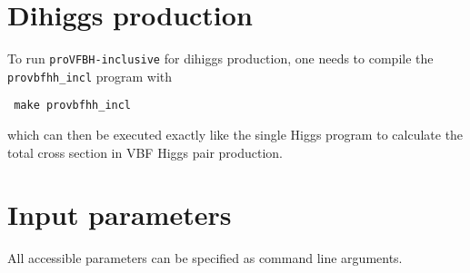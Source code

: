 \documentclass[12pt,a4]{article}
\newcommand{\provbfhincl}{\texttt{proVFBH-inclusive}\xspace}
\begin{document}
\section{Dihiggs production}
To run \provbfhincl for dihiggs production, one needs to compile the
\texttt{provbfhh\_incl} program with
\begin{verbatim}
 make provbfhh_incl
\end{verbatim}
which can then be executed exactly like the single Higgs program to
calculate the total cross section in VBF Higgs pair production.
\section{Input parameters}
All accessible parameters can be specified as command line arguments.
\end{document}
